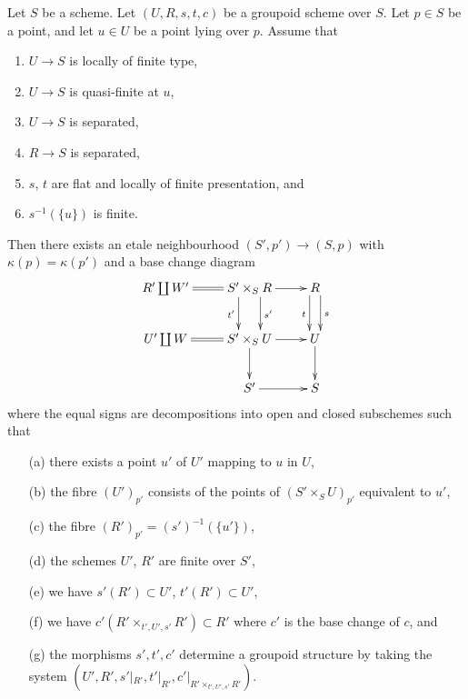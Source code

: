 \begin{lemma}
\label{lemma-quasi-finite-over-base}
Let $S$ be a scheme.
Let $(U, R, s, t, c)$ be a groupoid scheme over $S$.
Let $p \in S$ be a point, and let $u \in U$ be a point lying over $p$.
Assume that
\begin{enumerate}
\item $U \to S$ is locally of finite type,
\item $U \to S$ is quasi-finite at $u$,
\item $U \to S$ is separated,
\item $R \to S$ is separated,
\item $s$, $t$ are flat and locally of finite presentation, and
\item $s^{-1}(\{u\})$ is finite.
\end{enumerate}
Then there exists an etale neighbourhood $(S', p') \to (S, p)$ with
$\kappa(p) = \kappa(p')$ and a base change diagram
$$
\xymatrix{
R' \coprod W'
\ar@{=}[r] &
S' \times_S R
\ar[r] \ar@<2ex>[d]^{s'} \ar@<-2ex>[d]_{t'} &
R \ar@<1ex>[d]^s \ar@<-1ex>[d]_t \\
U' \coprod W
\ar@{=}[r] &
S' \times_S U
\ar[r] \ar[d] &
U \ar[d] \\
 &
S' \ar[r] &
S
}
$$
where the equal signs are decompositions into open and closed
subschemes such that
\begin{enumerate}
\item[(a)] there exists a point $u'$ of $U'$ mapping to $u$ in $U$,
\item[(b)] the fibre $(U')_{p'}$ consists of the points of
$(S' \times_S U)_{p'}$ equivalent to $u'$,
\item[(c)] the fibre $(R')_{p'} = (s')^{-1}(\{u'\})$,
\item[(d)] the schemes $U'$, $R'$ are finite over $S'$,
\item[(e)] we have $s'(R') \subset U'$, $t'(R') \subset U'$,
\item[(f)] we have
$c'(R' \times_{t', U', s'} R') \subset R'$
where $c'$ is the base change of $c$, and
\item[(g)] the morphisms $s', t', c'$ determine a groupoid structure
by taking the system
$(U', R', s'|_{R'}, t'|_{R'}, c'|_{R' \times_{t', U', s'} R'})$.
\end{enumerate}
\end{lemma}

